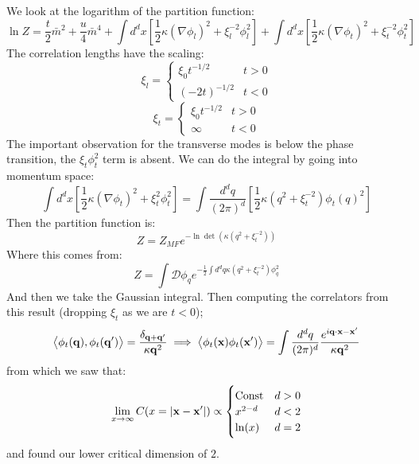 We look at the logarithm of the partition function:
\begin{equation}
    \ln Z = \frac{t}{2}\bar{m}^2 + \frac{u}{4}\bar{m}^4 + \int d^dx \left[\frac{1}{2}\kappa(\nabla \phi_l)^2 + \xi_l^{-2} \phi_l^2\right] + \int d^dx \left[\frac{1}{2}\kappa(\nabla \phi_t)^2 + \xi_t^{-2}\phi_t^2\right]
\end{equation}
The correlation lengths have the scaling:
\begin{equation}
    \xi_l = \begin{cases}
        \xi_0 t^{-1/2}  & t > 0 
        \\ (-2t)^{-1/2} & t < 0
    \end{cases}
\end{equation}
\begin{equation}
    \xi_t = \begin{cases}
        \xi_0 t^{-1/2} & t > 0 
        \\ \infty & t < 0
    \end{cases}
\end{equation}
The important observation for the transverse modes is below the phase transition, the $\xi_t\phi_t^2$ term is absent. We can do the integral by going into momentum space:
\begin{equation}
    \int d^dx \left[\frac{1}{2}\kappa(\nabla \phi_t)^2 + \xi_t^2\phi_t^2\right] = \int \frac{d^dq}{(2\pi)^d} \left[\frac{1}{2}\kappa (q^2 + \xi_t^{-2})\phi_t(q)^2\right]
\end{equation}
Then the partition function is:
\begin{equation}
    Z = Z_{MF}e^{-\ln\det(\kappa(q^2 + \xi_t^{-2}))}
\end{equation}
Where this comes from:
\begin{equation}
    Z = \int \mathcal{D}\phi_q e^{-\frac{1}{2}\int d^d q\kappa (q^2 + \xi_t^{-2})\phi_q^2}
\end{equation}
And then we take the Gaussian integral. Then computing the correlators from this result (dropping $\xi_t$ as we are $t < 0$);
\begin{equation}
    \left< \phi_t(\mathbf{q}), \phi_t(\mathbf{q}') \right> = \frac{\delta_{\mathbf{q} + \mathbf{q}'}}{\kappa \mathbf{q}^2} \implies \left< \phi_t(\mathbf{x})\phi_t(\mathbf{x}') \right> = \int \frac{d^dq}{(2\pi)^d} \frac{e^{i\mathbf{q} \cdot \mathbf{x} - \mathbf{x}'}}{\kappa \mathbf{q}^2}
\end{equation}
from which we saw that:
\begin{equation}
    \lim_{x \to \infty}C(x = \lvert \mathbf{x} - \mathbf{x}' \rvert) \propto \begin{cases}
        \text{Const} & d > 0
        \\ x^{2-d} & d < 2
        \\ \ln(x) & d =2 
    \end{cases}
\end{equation}
and found our lower critical dimension of $2$. 

